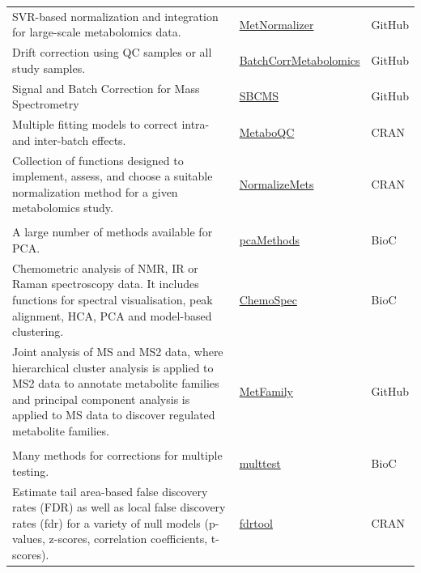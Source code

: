\documentclass[]{article}
\begin{document}
\begin{longtable}[t]{>{\raggedright\arraybackslash}p{30em}>{\raggedright\arraybackslash}p{10em}>{\raggedright\arraybackslash}p{3em}}
\rowcolor{gray!6}  SVR-based normalization and integration for large-scale metabolomics data. & \href{http://www.metabolomics-shanghai.org/softwaredetail.php?id=39}{MetNormalizer} & GitHub\\
Drift correction using QC samples or all study samples. & \href{https://github.com/rwehrens/BatchCorrMetabolomics}{BatchCorrMetabolomics} & GitHub\\
\rowcolor{gray!6}  Signal and Batch Correction for Mass Spectrometry & \href{https://github.com/computational-metabolomics/sbcms}{SBCMS} & GitHub\\
Multiple fitting models to correct intra- and inter-batch effects. & \href{https://cran.r-project.org/package=MetaboQC}{MetaboQC} & CRAN\\
\rowcolor{gray!6}  Collection of functions designed to implement, assess, and choose a suitable normalization method for a given metabolomics study. & \href{https://cran.r-project.org/package=NormalizeMets}{NormalizeMets} & CRAN\\
\addlinespace[0.3em]
\multicolumn{3}{l}{\textbf{Exploratory Data Analysis}}\\
A large number of methods available for PCA. & \href{http://bioconductor.org/packages/release/bioc/html/pcaMethods.html}{pcaMethods} & BioC\\
\rowcolor{gray!6}  Chemometric analysis of NMR, IR or Raman spectroscopy data. It includes functions for spectral visualisation, peak alignment, HCA, PCA and model-based clustering. & \href{https://cran.r-project.org/package=ChemoSpec}{ChemoSpec} & BioC\\
Joint analysis of MS and MS2 data, where hierarchical cluster analysis is applied to MS2 data to annotate metabolite families and principal component analysis is applied to MS data to discover regulated metabolite families. & \href{https://github.com/ipb-halle/MetFamily}{MetFamily} & GitHub\\
\rowcolor{gray!6}  \addlinespace[0.3em]
\multicolumn{3}{l}{\textbf{Univariate hypothesis testing}}\\
Many methods for corrections for multiple testing. & \href{http://bioconductor.org/packages/release/bioc/html/multtest.html}{multtest} & BioC\\
Estimate tail area-based false discovery rates (FDR) as well as local false discovery rates (fdr) for a variety of null models (p-values, z-scores, correlation coefficients, t-scores). & \href{http://strimmerlab.org/software/fdrtool/}{fdrtool} & CRAN\\

\end{longtable}
\end{document}
